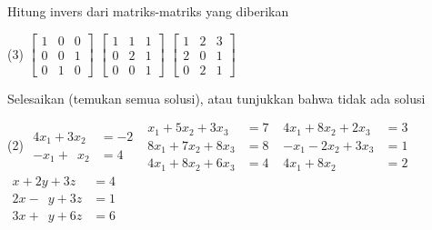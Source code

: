 \begin{exercise}
Hitung invers dari matriks-matriks yang diberikan
\begin{tasks}(3)
\task
$\begin{bmatrix}
1 & 0 & 0 \\
0 & 0 & 1 \\
0 & 1 & 0
\end{bmatrix}$
\task
$\begin{bmatrix}
1 & 1 & 1 \\
0 & 2 & 1 \\
0 & 0 & 1
\end{bmatrix}$
\task
$\begin{bmatrix}
1 & 2 & 3 \\
2 & 0 & 1 \\
0 & 2 & 1
\end{bmatrix}$
\end{tasks}
\end{exercise}

\begin{exercise}
Selesaikan (temukan semua solusi), atau tunjukkan bahwa tidak ada solusi
\begin{tasks}(2)
\task
$\begin{aligned}
 4x_1+3x_2 & = -2 \\
 -x_1+\phantom{3} x_2 & = 4
\end{aligned}$
\task
$\begin{aligned}
  x_1+5x_2+3x_3 & = 7 \\
 8x_1+7x_2+8x_3 & = 8 \\
 4x_1+8x_2+6x_3 & = 4
\end{aligned}$
\task
$\begin{aligned}
 4x_1+8x_2+2x_3 & = 3 \\
 -x_1-2x_2+3x_3 & = 1 \\
 4x_1+8x_2 \phantom{{}+3x_3} & = 2
\end{aligned}$
\task
$\begin{aligned}
  x+2y+3z & = 4 \\
2  x-\phantom{2} y+3z & = 1 \\
3  x+\phantom{2} y+6z & = 6
\end{aligned}$
\end{tasks}
\end{exercise}

